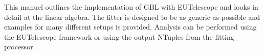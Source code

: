 This manuel outlines the implementation of GBL with EUTelescope and looks in detail at the linear algebra. The fitter is designed to be as generic as possible and examples for many different setups is provided. Analysis can be performed using the EUTelescope framework or using the output NTuples from the fitting processor.




